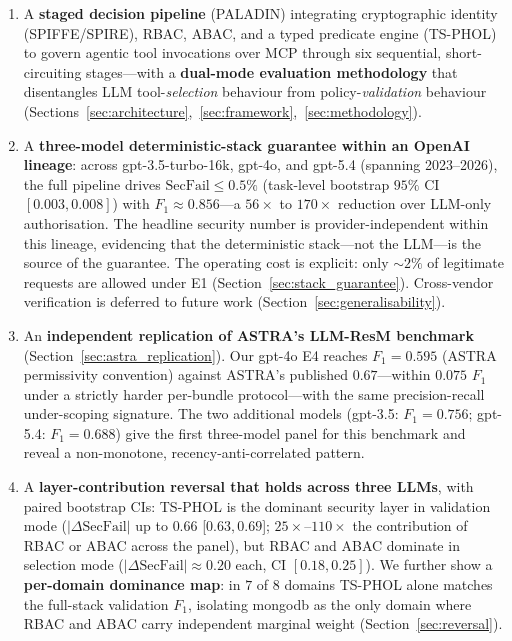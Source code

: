 \documentclass[10pt,a4paper,twocolumn]{article}
\begin{document}
\begin{enumerate}
  \item A \textbf{staged decision pipeline} (PALADIN) integrating cryptographic identity (SPIFFE/SPIRE), RBAC, ABAC, and a typed predicate engine (TS-PHOL) to govern agentic tool invocations over MCP through six sequential, short-circuiting stages---with a \textbf{dual-mode evaluation methodology} that disentangles LLM tool-\emph{selection} behaviour from policy-\emph{validation} behaviour (Sections~\ref{sec:architecture},~\ref{sec:framework},~\ref{sec:methodology}).

  \item A \textbf{three-model deterministic-stack guarantee within an OpenAI lineage}: across gpt-3.5-turbo-16k, gpt-4o, and gpt-5.4 (spanning 2023--2026), the full pipeline drives $\mathrm{SecFail} \leq 0.5\%$ (task-level bootstrap $95\%$ CI $[0.003, 0.008]$) with $F_1 \approx 0.856$---a $56\times$ to $170\times$ reduction over LLM-only authorisation. The headline security number is provider-independent within this lineage, evidencing that the deterministic stack---not the LLM---is the source of the guarantee. The operating cost is explicit: only $\sim 2\%$ of legitimate requests are allowed under E1 (Section~\ref{sec:stack_guarantee}). Cross-vendor verification is deferred to future work (Section~\ref{sec:generalisability}).

  \item An \textbf{independent replication of ASTRA's LLM-ResM benchmark} (Section~\ref{sec:astra_replication}). Our gpt-4o E4 reaches $F_1 = 0.595$ (ASTRA permissivity convention) against ASTRA's published $0.67$---within $0.075$ $F_1$ under a strictly harder per-bundle protocol---with the same precision-recall under-scoping signature. The two additional models (gpt-3.5: $F_1=0.756$; gpt-5.4: $F_1=0.688$) give the first three-model panel for this benchmark and reveal a non-monotone, recency-anti-correlated pattern.

  \item A \textbf{layer-contribution reversal that holds across three LLMs}, with paired bootstrap CIs: TS-PHOL is the dominant security layer in validation mode ($|\Delta\mathrm{SecFail}|$ up to $0.66$ [$0.63, 0.69$]; $25\times$--$110\times$ the contribution of RBAC or ABAC across the panel), but RBAC and ABAC dominate in selection mode ($|\Delta\mathrm{SecFail}| \approx 0.20$ each, CI $[0.18, 0.25]$). We further show a \textbf{per-domain dominance map}: in $7$ of $8$ domains TS-PHOL alone matches the full-stack validation $F_1$, isolating mongodb as the only domain where RBAC and ABAC carry independent marginal weight (Section~\ref{sec:reversal}).


\end{enumerate}
\end{document}
